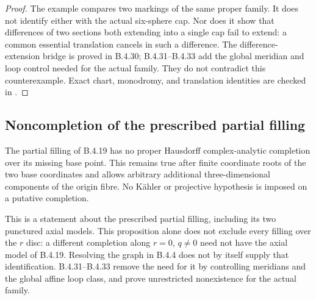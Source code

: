 \begin{proof}
The example compares two markings of the same
proper family. It does not identify either
with the actual six-sphere cap. Nor does it
show that differences of two sections both
extending into a single cap fail to extend:
a common essential translation cancels in
such a difference. The difference-extension bridge
is proved in B.4.30; B.4.31--B.4.33 add the global
meridian and loop control needed for the actual family.
They do not contradict this counterexample. Exact chart,
monodromy, and translation identities are
checked in
.
\end{proof}

\subsection{Noncompletion of the prescribed partial filling}

\begin{proposition}\label{push:src:B.4.30}
\label{push:B430}
The partial filling of B.4.19 has no proper
Hausdorff complex-analytic completion over its
missing base point. This remains true after finite
coordinate roots of the two base coordinates and
allows arbitrary additional three-dimensional
components of the origin fibre. No K\"ahler or
projective hypothesis is imposed on a putative
completion.

This is a statement about the prescribed partial
filling, including its two punctured axial models.
This proposition alone does not exclude every filling
over the $r$ disc: a different completion along
$r=0$, $q\ne0$ need not have the axial model of
B.4.19. Resolving the graph in B.4.4 does not by
itself supply that identification. B.4.31--B.4.33
remove the need for it by controlling meridians and
the global affine loop class, and prove unrestricted
nonexistence for the actual family.
\end{proposition}

